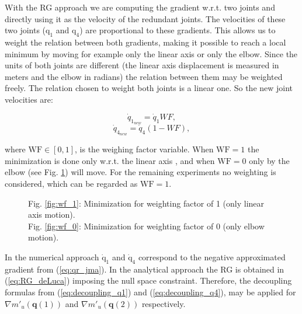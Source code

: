 With the RG approach we are computing the gradient w.r.t. two joints and directly using it as the velocity of the redundant joints. The velocities of these two joints ($\mathrm{q_1}$ and $\mathrm{q_4}$) are proportional to these gradients. This allows us to weight the relation between both gradients, making it possible to reach a local minimum
by moving for example only the linear axis or only the elbow. Since the units of both joints are different (the linear axis displacement is measured in meters and the elbow in radians) the relation between them may be weighted freely.
The relation chosen to weight both joints is a linear one. So the new joint velocities are: 

\begin{equation}
	{\dot{q}}_{1_{new}}  = {\dot{q}}_{1}WF,
	\label{eq:decoupling_q1} 
\end{equation} 
\begin{equation}
		{\dot{q}}_{4_{new}} = {\dot{q}}_{4}(1-WF),
	\label{eq:decoupling_q4}
\end{equation}


where $\mathrm{WF \in [0,1]}$, is the weighing factor variable.
When $\mathrm{WF=1}$ the minimization is done only w.r.t. the linear axis , and when $\mathrm{WF=0}$ only by the elbow (see Fig. \ref{fig:wf}) will move.
For the  remaining experiments no weighting is considered, which can be regarded as $\mathrm{WF=1}$.

\begin{figure}[!h]
	\centering	
	 	 	 	
	\caption{Fig. \ref{fig:wf_1}:  Minimization for weighting factor of 1 (only  linear axis motion). \\ Fig. \ref{fig:wf_0}: Minimization for weighting factor of 0 (only elbow motion). }
	\label{fig:wf}
\end{figure}

In the numerical approach $\mathrm{{\dot{q}}_{1}}$ and $\mathrm{{\dot{q}}_{4}}$ correspond to the negative approximated gradient from (\ref{eq:qr_jma}). In the analytical approach the RG is obtained in (\ref{eq:RG_deLuca}) imposing the null space constraint. Therefore, the decoupling formulas from (\ref{eq:decoupling_q1}) and (\ref{eq:decoupling_q4}), may be applied  for $\nabla m'_u(\mathbf{q}(1))$ and  $\nabla m'_u(\mathbf{q}(2))$ respectively.



